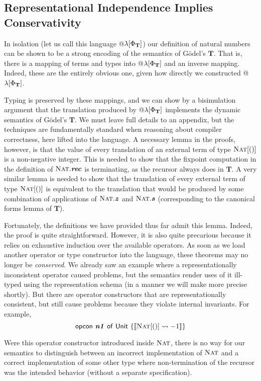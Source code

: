 \documentclass[9pt,preprint]{sigplanconf}
\begin{document}
\subsection{Representational Independence Implies Conservativity}\label{repind}
In isolation (let us call this language @$\lambda[\fvalCtx_{\mathbf{T}}]$) our definition of natural numbers can be shown to be a strong encoding of the semantics of G\"odel's $\mathbf{T}$. That is, there is a mapping of terms and types into @$\lambda[\fvalCtx_{\mathbf{T}}]$ and an inverse mapping. Indeed, these are the entirely obvious one, given how directly we constructed @$\lambda[\fvalCtx_{\mathbf{T}}]$. 

Typing is preserved by  these mappings, and we can show by a bisimulation argument that the translation produced by @$\lambda[\fvalCtx_{\mathbf{T}}]$ implements the dynamic semantics of G\"odel's $\mathbf{T}$. We must leave full details to an appendix, but the techniques are fundamentally standard when reasoning about compiler correctness, here lifted into the language. A necessary lemma in the proofs, however, is that the value of every translation of an external term of type $\ttype{Nat}{\tunit}$ is a non-negative integer. This is needed to show that the fixpoint computation in the definition of $\fvar{Nat}.\opvar{rec}$ is terminating, as the recursor always does in $\mathbf{T}$. A very similar lemma is needed to show that the translation of every external term of type $\ttype{Nat}{\tunit}$ is equivalent to the translation that would be produced by some combination of applications of $\fvar{Nat}.\opvar{z}$ and $\fvar{Nat}.\opvar{s}$ (corresponding to the canonical forms lemma of $\mathbf{T}$). 

Fortunately, the definitions we have provided thus far admit this lemma. Indeed, the proof is quite straightforward. However, it is also quite precarious because it relies on exhaustive induction over the available operators. As soon as we load another operator or type constructor into the language, these theorems may no longer be \emph{conserved}. We already saw an example where a representationally inconsistent operator caused problems, but the semantics render uses of it ill-typed using the representation schema (in a manner we will make more precise shortly). But there are operator constructors that are representationally consistent, but still cause problems because they violate internal invariants. For example, $$\tops{n1}{\kunit}{i}{a}{\tden{-1}{\ttype{Nat}{\tunit}}}$$

Were this operator constructor introduced inside $\fvar{Nat}$, there is no way for our semantics to distinguish between an incorrect implementation of $\fvar{Nat}$ and a correct implementation of some other type where non-termination of the recursor was the intended behavior (without a separate specification). 
\end{document}
